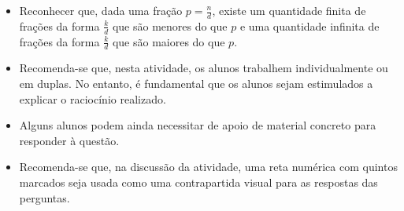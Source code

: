 \begin{multicols}{2}
\begin{solucao}{}{}
\begin{center}
\end{center}

 \end{solucao}
\clearpage

\begin{objetivos}[label=chap4-ativ12]{}{}
\begin{itemize} %
    \item       Reconhecer que, dada uma fração       $p = \frac{n}{d}$, existe
um quantidade finita de frações da forma       $\frac{k}{d}$       que são
menores do que       $p$       e uma quantidade infinita de frações da forma
  $\frac{k}{d}$       que são maiores do que       $p$.
\end{itemize} %
\end{objetivos}

\begin{orientacoes}{}{}

\begin{itemize} %
    \item       Recomenda-se que, nesta atividade, os alunos trabalhem
individualmente ou em duplas. No entanto, é fundamental que os alunos sejam
estimulados a explicar o raciocínio realizado.
    \item       Alguns alunos podem ainda necessitar de apoio de material
concreto para responder à questão.
    \item       Recomenda-se que, na discussão da atividade, uma reta numérica
com quintos marcados seja usada como uma contrapartida visual para as respostas
das perguntas.
\end{itemize} %


\noindent 
\begin{center}
\end{center}



\end{orientacoes}
\end{multicols}
